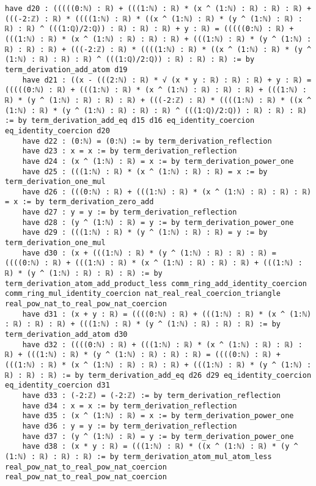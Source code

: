 \documentclass{article}
\begin{document}
\begin{tcolorbox}[colback=white!10, width=\linewidth]
\begin{lstlisting}[language=Lean4]
    have d20 : (((((0:ℕ) : ℝ) + (((1:ℕ) : ℝ) * (x ^ (1:ℕ) : ℝ) : ℝ) : ℝ) + (((-2:ℤ) : ℝ) * ((((1:ℕ) : ℝ) * ((x ^ (1:ℕ) : ℝ) * (y ^ (1:ℕ) : ℝ) : ℝ) : ℝ) ^ (((1:ℚ)/2:ℚ)) : ℝ) : ℝ) : ℝ) + y : ℝ) = (((((0:ℕ) : ℝ) + (((1:ℕ) : ℝ) * (x ^ (1:ℕ) : ℝ) : ℝ) : ℝ) + (((1:ℕ) : ℝ) * (y ^ (1:ℕ) : ℝ) : ℝ) : ℝ) + (((-2:ℤ) : ℝ) * ((((1:ℕ) : ℝ) * ((x ^ (1:ℕ) : ℝ) * (y ^ (1:ℕ) : ℝ) : ℝ) : ℝ) ^ (((1:ℚ)/2:ℚ)) : ℝ) : ℝ) : ℝ) := by term_derivation_add_atom d19
    have d21 : ((x - (((2:ℕ) : ℝ) * √ (x * y : ℝ) : ℝ) : ℝ) + y : ℝ) = (((((0:ℕ) : ℝ) + (((1:ℕ) : ℝ) * (x ^ (1:ℕ) : ℝ) : ℝ) : ℝ) + (((1:ℕ) : ℝ) * (y ^ (1:ℕ) : ℝ) : ℝ) : ℝ) + (((-2:ℤ) : ℝ) * ((((1:ℕ) : ℝ) * ((x ^ (1:ℕ) : ℝ) * (y ^ (1:ℕ) : ℝ) : ℝ) : ℝ) ^ (((1:ℚ)/2:ℚ)) : ℝ) : ℝ) : ℝ) := by term_derivation_add_eq d15 d16 eq_identity_coercion eq_identity_coercion d20
    have d22 : (0:ℕ) = (0:ℕ) := by term_derivation_reflection
    have d23 : x = x := by term_derivation_reflection
    have d24 : (x ^ (1:ℕ) : ℝ) = x := by term_derivation_power_one
    have d25 : (((1:ℕ) : ℝ) * (x ^ (1:ℕ) : ℝ) : ℝ) = x := by term_derivation_one_mul
    have d26 : (((0:ℕ) : ℝ) + (((1:ℕ) : ℝ) * (x ^ (1:ℕ) : ℝ) : ℝ) : ℝ) = x := by term_derivation_zero_add
    have d27 : y = y := by term_derivation_reflection
    have d28 : (y ^ (1:ℕ) : ℝ) = y := by term_derivation_power_one
    have d29 : (((1:ℕ) : ℝ) * (y ^ (1:ℕ) : ℝ) : ℝ) = y := by term_derivation_one_mul
    have d30 : (x + (((1:ℕ) : ℝ) * (y ^ (1:ℕ) : ℝ) : ℝ) : ℝ) = ((((0:ℕ) : ℝ) + (((1:ℕ) : ℝ) * (x ^ (1:ℕ) : ℝ) : ℝ) : ℝ) + (((1:ℕ) : ℝ) * (y ^ (1:ℕ) : ℝ) : ℝ) : ℝ) := by term_derivation_atom_add_product_less comm_ring_add_identity_coercion comm_ring_mul_identity_coercion nat_real_real_coercion_triangle real_pow_nat_to_real_pow_nat_coercion
    have d31 : (x + y : ℝ) = ((((0:ℕ) : ℝ) + (((1:ℕ) : ℝ) * (x ^ (1:ℕ) : ℝ) : ℝ) : ℝ) + (((1:ℕ) : ℝ) * (y ^ (1:ℕ) : ℝ) : ℝ) : ℝ) := by term_derivation_add_atom d30
    have d32 : ((((0:ℕ) : ℝ) + (((1:ℕ) : ℝ) * (x ^ (1:ℕ) : ℝ) : ℝ) : ℝ) + (((1:ℕ) : ℝ) * (y ^ (1:ℕ) : ℝ) : ℝ) : ℝ) = ((((0:ℕ) : ℝ) + (((1:ℕ) : ℝ) * (x ^ (1:ℕ) : ℝ) : ℝ) : ℝ) + (((1:ℕ) : ℝ) * (y ^ (1:ℕ) : ℝ) : ℝ) : ℝ) := by term_derivation_add_eq d26 d29 eq_identity_coercion eq_identity_coercion d31
    have d33 : (-2:ℤ) = (-2:ℤ) := by term_derivation_reflection
    have d34 : x = x := by term_derivation_reflection
    have d35 : (x ^ (1:ℕ) : ℝ) = x := by term_derivation_power_one
    have d36 : y = y := by term_derivation_reflection
    have d37 : (y ^ (1:ℕ) : ℝ) = y := by term_derivation_power_one
    have d38 : (x * y : ℝ) = (((1:ℕ) : ℝ) * ((x ^ (1:ℕ) : ℝ) * (y ^ (1:ℕ) : ℝ) : ℝ) : ℝ) := by term_derivation_atom_mul_atom_less real_pow_nat_to_real_pow_nat_coercion real_pow_nat_to_real_pow_nat_coercion

\end{lstlisting}
\end{tcolorbox}
\end{document}
